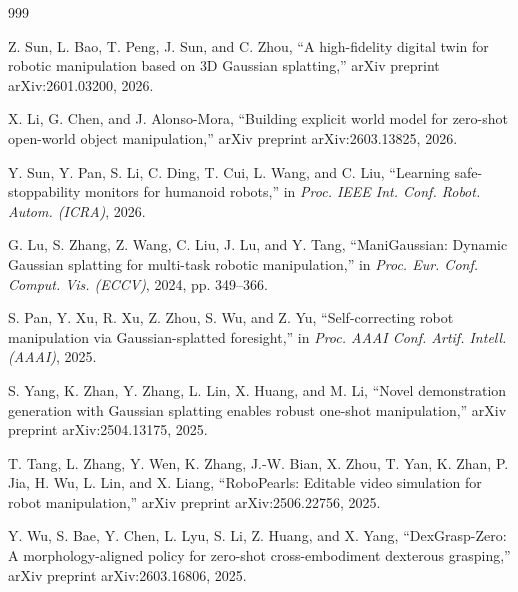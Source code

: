 \documentclass[12pt,a4paper,oneside]{report}
\begin{document}
\begin{thebibliography}{999}

Z. Sun, L. Bao, T. Peng, J. Sun, and C. Zhou, ``A high-fidelity digital twin for robotic manipulation based on {3D} Gaussian splatting,'' arXiv preprint arXiv:2601.03200, 2026.




X. Li, G. Chen, and J. Alonso-Mora, ``Building explicit world model for zero-shot open-world object manipulation,'' arXiv preprint arXiv:2603.13825, 2026.




Y. Sun, Y. Pan, S. Li, C. Ding, T. Cui, L. Wang, and C. Liu, ``Learning safe-stoppability monitors for humanoid robots,'' in \textit{Proc. IEEE Int. Conf. Robot. Autom. (ICRA)}, 2026.




G. Lu, S. Zhang, Z. Wang, C. Liu, J. Lu, and Y. Tang, ``{ManiGaussian}: Dynamic Gaussian splatting for multi-task robotic manipulation,'' in \textit{Proc. Eur. Conf. Comput. Vis. (ECCV)}, 2024, pp. 349--366.




S. Pan, Y. Xu, R. Xu, Z. Zhou, S. Wu, and Z. Yu, ``Self-correcting robot manipulation via Gaussian-splatted foresight,'' in \textit{Proc. AAAI Conf. Artif. Intell. (AAAI)}, 2025.




S. Yang, K. Zhan, Y. Zhang, L. Lin, X. Huang, and M. Li, ``Novel demonstration generation with Gaussian splatting enables robust one-shot manipulation,'' arXiv preprint arXiv:2504.13175, 2025.




T. Tang, L. Zhang, Y. Wen, K. Zhang, J.-W. Bian, X. Zhou, T. Yan, K. Zhan, P. Jia, H. Wu, L. Lin, and X. Liang, ``{RoboPearls}: Editable video simulation for robot manipulation,'' arXiv preprint arXiv:2506.22756, 2025.




Y. Wu, S. Bae, Y. Chen, L. Lyu, S. Li, Z. Huang, and X. Yang, ``{DexGrasp-Zero}: A morphology-aligned policy for zero-shot cross-embodiment dexterous grasping,'' arXiv preprint arXiv:2603.16806, 2025.




\end{thebibliography}
\end{document}
